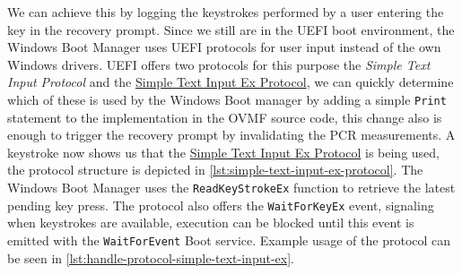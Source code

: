 We can achieve this by logging the keystrokes performed by a user entering the key in the recovery prompt.
Since we still are in the \ac{UEFI} boot environment, the Windows Boot Manager uses \ac{UEFI} protocols for user input instead of the own Windows drivers.
\ac{UEFI} offers two protocols for this purpose the \emph{Simple Text Input Protocol} and the \hyperref[lst:simple-text-input-ex-protocol]{Simple Text Input Ex Protocol}, we can quickly determine which of these is used by the Windows Boot manager by adding a simple \lstinline{Print} statement to the implementation in the \ac{OVMF} source code, this change also is enough to trigger the recovery prompt by invalidating the \ac{PCR} measurements.
A keystroke now shows us that the \hyperref[lst:simple-text-input-ex-protocol]{Simple Text Input Ex Protocol} is being used, the protocol structure is depicted in \autoref{lst:simple-text-input-ex-protocol}.
The Windows Boot Manager uses the \lstinline{ReadKeyStrokeEx} function to retrieve the latest pending key press.
The protocol also offers the \lstinline{WaitForKeyEx} event, signaling when keystrokes are available, execution can be blocked until this event is emitted with the \lstinline{WaitForEvent} Boot service. Example usage of the protocol can be seen in \autoref{lst:handle-protocol-simple-text-input-ex}.



